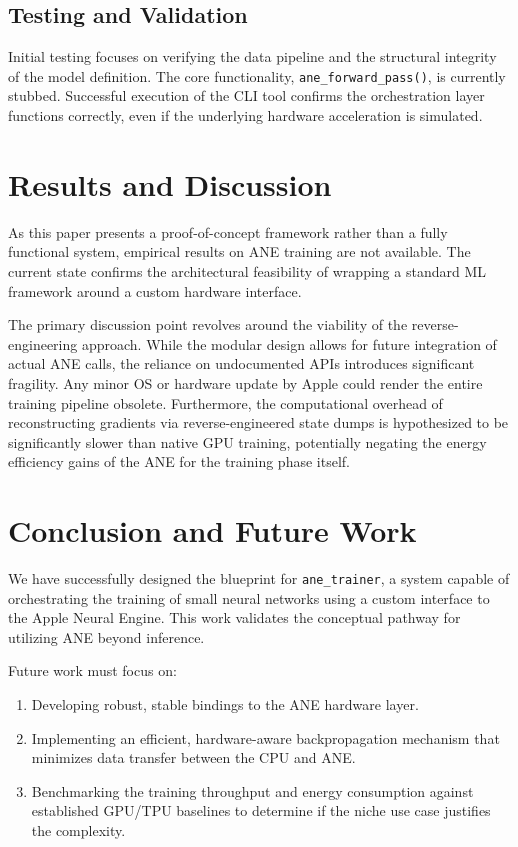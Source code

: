 \documentclass[11pt,a4paper]{article}
\begin{document}
\subsection{Testing and Validation}
Initial testing focuses on verifying the data pipeline and the structural integrity of the model definition. The core functionality, \texttt{ane\_forward\_pass()}, is currently stubbed. Successful execution of the CLI tool confirms the orchestration layer functions correctly, even if the underlying hardware acceleration is simulated.

\section{Results and Discussion}
As this paper presents a proof-of-concept framework rather than a fully functional system, empirical results on ANE training are not available. The current state confirms the architectural feasibility of wrapping a standard ML framework around a custom hardware interface.

The primary discussion point revolves around the viability of the reverse-engineering approach. While the modular design allows for future integration of actual ANE calls, the reliance on undocumented APIs introduces significant fragility. Any minor OS or hardware update by Apple could render the entire training pipeline obsolete. Furthermore, the computational overhead of reconstructing gradients via reverse-engineered state dumps is hypothesized to be significantly slower than native GPU training, potentially negating the energy efficiency gains of the ANE for the training phase itself.

\section{Conclusion and Future Work}
We have successfully designed the blueprint for \texttt{ane\_trainer}, a system capable of orchestrating the training of small neural networks using a custom interface to the Apple Neural Engine. This work validates the conceptual pathway for utilizing ANE beyond inference.

Future work must focus on:
\begin{enumerate}
    \item Developing robust, stable bindings to the ANE hardware layer.
    \item Implementing an efficient, hardware-aware backpropagation mechanism that minimizes data transfer between the CPU and ANE.
    \item Benchmarking the training throughput and energy consumption against established GPU/TPU baselines to determine if the niche use case justifies the complexity.
\end{enumerate}



\end{document}
